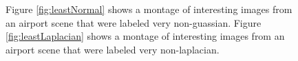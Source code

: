 \begin{figure}
	\centering
	
	
			\caption[Least Gaussian and Least Laplacian Images.]{Figure \ref{fig:leastNormal} shows a montage of interesting images from an airport scene that were labeled very non-guassian. Figure \ref{fig:leastLaplacian} shows a montage of interesting images from an airport scene that were labeled very non-laplacian.}
\end{figure}



